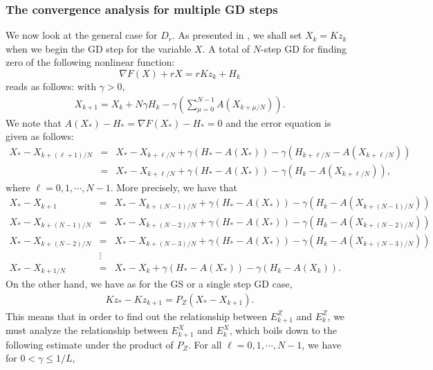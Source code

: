 \begin{itemize}
\subsubsection{The convergence analysis for multiple GD steps}
We now look at the general case for $D_r$. As presented in \cite{mishchenko2022proxskip}, we shall set $X_k = Kz_k$ when we begin the GD step for the variable $X$. A total of $N$-step GD for finding zero of the following nonlinear function: 
\begin{equation} 
\nabla F(X) + r X = rKz_k + H_k 
\end{equation} 
reads as follows: with $\gamma > 0$, 
\begin{eqnarray*} 
X_{k+1} = X_{k} + N \gamma H_k - \gamma \left ( \sum_{\mu = 0}^{N-1} A\left ( X_{k + \mu/N}\right ) \right ).
\end{eqnarray*}
We note that $A(X_*) - H_* = \nabla F(X_*) - H_* = 0$ and the 
error equation is given as follows:  
\begin{eqnarray*}
X_{*} - X_{k+(\ell+1)/N} &=& X_* - X_{k + \ell/N} + \gamma (H_* - A(X_*)) - \gamma(H_{k + \ell/N} - A(X_{k + \ell/N})) \\
&=& X_* - X_{k+\ell/N} + \gamma (H_* - A (X_*)) - \gamma (H_{k} - A(X_{k + \ell/N})),  
\end{eqnarray*}
where $\ell = 0,1,\cdots,N-1$. More precisely, we have that 
\begin{eqnarray*}
X_{*} - X_{k+1} &=& X_* - X_{k + (N-1)/N} + \gamma (H_* - A (X_*)) - \gamma (H_{k} - A(X_{k + (N-1)/N})) \\ 
X_{*} - X_{k+(N-1)/N} &=& X_* - X_{k + (N-2)/N} + \gamma (H_* - A (X_*)) - \gamma (H_{k} - A(X_{k + (N-2)/N})) \\  
X_{*} - X_{k+(N-2)/N} &=& X_* - X_{k + (N-3)/N} + \gamma (H_* - A (X_*)) - \gamma (H_{k} - A(X_{k + (N-3)/N})) \\  
&\vdots& \\ 
X_{*} - X_{k+1/N} &=& X_* - X_{k} + \gamma (H_* - A (X_*)) - \gamma (H_{k} - A(X_{k})).  
\end{eqnarray*}
On the other hand, we have as for the GS or a single step GD case,
\begin{eqnarray*}
Kz_{*} - Kz_{k+1} = P_Z \left ( X_* - X_{k+1} \right ). 
\end{eqnarray*}
This means that in order to find out the relationship between $E_{k+1}^Z$ and $E_k^Z$, we must analyze the relationship between $E_{k+1}^X$ and $E_{k}^X$, which boils down to the following estimate under the product of $P_Z$. For all $\ell = 0,1,\cdots,N-1$, we have for $0 < \gamma \leq 1/L$, 

\end{itemize}
